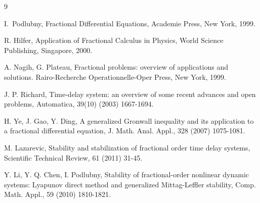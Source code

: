 \begin{thebibliography}{9}

 I.~Podlubny, Fractional Differential Equations, Academie Press, New York, 1999.

 R. Hilfer, Application of Fractional Calculus in Physics, World Science Publishing, Singapore, 2000.

 A. Nagih, G. Plateau, Fractional problems: overview of applications and solutions. Rairo-Recherche Operationnelle-Oper Press, New York, 1999.

 J. P. Richard, Time-delay system: an overview of some recent advances and open problems, Automatica, 39(10) (2003) 1667-1694.

 H. Ye, J. Gao, Y. Ding, A generalized Gronwall inequality and its application to a fractional differential equation, J. Math. Anal. Appl., 328 (2007) 1075-1081.

 M. Lazarevic, Stability and stabilization of fractional order time delay systems, Scientific Technical Review, 61 (2011) 31-45.

 Y. Li, Y. Q. Chen, I. Podlubny, Stability of fractional-order nonlinear dynamic systems: Lyapunov direct method and generalized Mittag-Leffler stability, Comp. Math. Appl., 59 (2010) 1810-1821.

\end{thebibliography}

